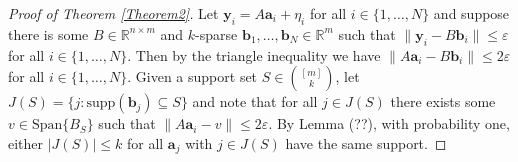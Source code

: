 \documentclass[journal, onecolumn]{IEEEtran}
\begin{document}
\begin{proof}[Proof of Theorem \ref{Theorem2}]
Let $\mathbf{y}_i = A\mathbf{a}_i + \eta_i$ for all $i \in \{1, \ldots, N\}$ and suppose there is some $B \in \mathbb{R}^{n \times m}$ and $k$-sparse $\mathbf{b}_1, \ldots, \mathbf{b}_N \in \mathbb{R}^m$ such that $\|\mathbf{y}_i - B\mathbf{b}_i\| \leq \varepsilon$ for all $i \in \{1, \ldots, N\}$. Then by the triangle inequality we have $\|A\mathbf{a}_i - B\mathbf{b}_i\| \leq 2\varepsilon$ for all $i \in \{1, \ldots, N\}$. Given a support set $S \in {[m]\choose k}$, let $J(S) = \{j: \text{supp}(\mathbf{b}_j) \subseteq S\}$ and note that for all $j \in J(S)$ there exists some $v \in \text{Span}\{B_S\}$ such that $\|A\mathbf{a}_i - v\| \leq 2\varepsilon$. By Lemma (??), with probability one, either $|J(S)| \leq k$ for all $\mathbf{a}_j$ with $j \in J(S)$ have the same support.
\end{proof}
\end{document}
